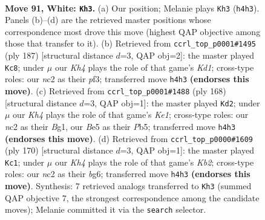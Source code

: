 \documentclass[11pt]{article}
\begin{document}
\clearpage

\begin{figure}[p]\centering
\begin{subfigure}{0.46\textwidth}\centering
\resizebox{\linewidth}{!}{%
\newchessgame
\chessboard[
  setfen={8/7k/8/4B3/2b4K/8/2n2P2/8 w - - 27 91},
  showmover=false,
  pgfstyle=straightmove, color=movearrow, markmove={h4-h3}
]}
\caption{}
\end{subfigure}\hfill
\begin{subfigure}{0.46\textwidth}\centering
\resizebox{\linewidth}{!}{%
\newchessgame
\chessboard[
  setfen={3k4/8/8/4p3/8/4bP2/B7/3K4 b - - 10 94},
  showmover=false,
  pgfstyle=straightmove, color=movearrow, markmove={d8-c8}
]}
\caption{}
\end{subfigure}
\\[4pt]
\begin{subfigure}{0.46\textwidth}\centering
\resizebox{\linewidth}{!}{%
\newchessgame
\chessboard[
  setfen={8/8/3k4/1P5b/5p2/8/8/4K1B1 w - - 8 85},
  showmover=false,
  pgfstyle=straightmove, color=movearrow, markmove={e1-d2}
]}
\caption{}
\end{subfigure}\hfill
\begin{subfigure}{0.46\textwidth}\centering
\resizebox{\linewidth}{!}{%
\newchessgame
\chessboard[
  setfen={5B2/3k4/6b1/6P1/8/8/1K6/8 w - - 3 86},
  showmover=false,
  pgfstyle=straightmove, color=movearrow, markmove={b2-c1}
]}
\caption{}
\end{subfigure}
\caption{\textbf{Move 91, White: \texttt{Kh3}.} (a) Our position; Melanie plays \texttt{Kh3} (\texttt{h4h3}). Panels (b)--(d) are the retrieved master positions whose correspondence most drove this move (highest QAP objective among those that transfer to it). (b) Retrieved from \texttt{ccrl\_top\_p0001\#1495} (ply 187) [structural distance $d$=3, QAP obj=2]: the master played \texttt{Kc8}; under $\mu$ our \emph{Kh4} plays the role of that game's \emph{Kd1}; cross-type roles: our \emph{n}c2 as their \emph{p}f3; transferred move \texttt{h4h3} \textbf{(endorses this move)}. (c) Retrieved from \texttt{ccrl\_top\_p0001\#1488} (ply 168) [structural distance $d$=3, QAP obj=1]: the master played \texttt{Kd2}; under $\mu$ our \emph{Kh4} plays the role of that game's \emph{Ke1}; cross-type roles: our \emph{n}c2 as their \emph{B}g1, our \emph{B}e5 as their \emph{P}b5; transferred move \texttt{h4h3} \textbf{(endorses this move)}. (d) Retrieved from \texttt{ccrl\_top\_p0000\#1609} (ply 170) [structural distance $d$=3, QAP obj=1]: the master played \texttt{Kc1}; under $\mu$ our \emph{Kh4} plays the role of that game's \emph{Kb2}; cross-type roles: our \emph{n}c2 as their \emph{b}g6; transferred move \texttt{h4h3} \textbf{(endorses this move)}. Synthesis: 7 retrieved analogs transferred to \texttt{Kh3} (summed QAP objective 7, the strongest correspondence among the candidate moves); Melanie committed it via the \texttt{search} selector.}
\label{fig:thought-m180}
\end{figure}
\end{document}
